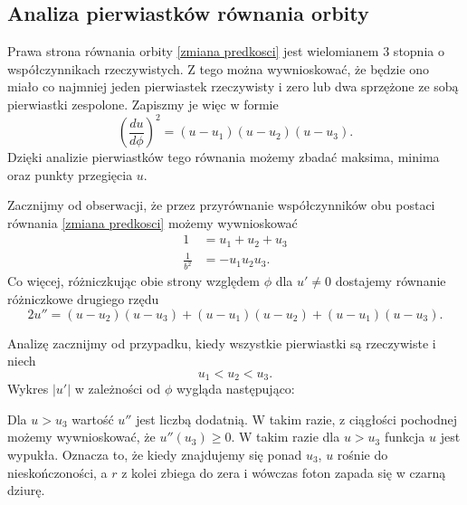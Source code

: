 \subsection{Analiza pierwiastków równania orbity}

Prawa strona równania orbity \ref{zmiana predkosci} jest wielomianem $3$ stopnia o współczynnikach rzeczywistych. Z tego można wywnioskować, że będzie ono miało co najmniej jeden pierwiastek rzeczywisty i zero lub dwa sprzężone ze sobą pierwiastki zespolone. Zapiszmy je więc w formie
$$\left(\frac{du}{d\phi}\right)^2=(u-u_1)(u-u_2)(u-u_3).$$
Dzięki analizie pierwiastków tego równania możemy zbadać maksima, minima oraz punkty przegięcia $u$.

Zacznijmy od obserwacji, że przez przyrównanie współczynników obu postaci równania \ref{zmiana predkosci} możemy wywnioskować
\begin{align*}
  1&=u_1+u_2+u_3\\
  \frac{1}{b^2}&=-u_1u_2u_3.
\end{align*}
Co więcej, różniczkując obie strony względem $\phi$ dla $u'\neq 0$ dostajemy równanie różniczkowe drugiego rzędu
$$2u''=(u-u_2)(u-u_3)+(u-u_1)(u-u_2)+(u-u_1)(u-u_3).$$

Analizę zacznijmy od przypadku, kiedy wszystkie pierwiastki są rzeczywiste i niech 
$$u_1<u_2<u_3.$$ 
Wykres $|u'|$ w zależności od $\phi$ wygląda następująco:
\begin{center}
\end{center}

Dla $u>u_3$ wartość $u''$ jest liczbą dodatnią. W takim razie, z ciągłości pochodnej możemy wywnioskować, że $u''(u_3)\geq0$. W takim razie dla $u>u_3$ funkcja $u$ jest wypukła. Oznacza to, że kiedy znajdujemy się ponad $u_3$, $u$ rośnie do nieskończoności, a $r$ z kolei zbiega do zera i wówczas foton zapada się w czarną dziurę. 

